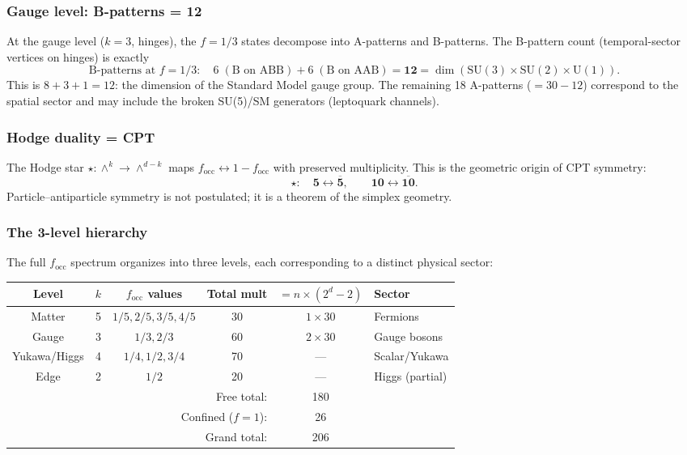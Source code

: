 \subsubsection{Gauge level: B-patterns = 12}

At the gauge level ($k = 3$, hinges), the $f = 1/3$ states decompose into A-patterns and B-patterns.  The B-pattern count (temporal-sector vertices on hinges) is exactly
\begin{equation}
\text{B-patterns at } f = 1/3: \quad 6\;(\text{B on ABB}) + 6\;(\text{B on AAB}) = \mathbf{12} = \dim(\text{SU}(3) \times \text{SU}(2) \times \text{U}(1)).
\end{equation}
This is $8 + 3 + 1 = 12$: the dimension of the Standard Model gauge group.  The remaining 18 A-patterns ($= 30 - 12$) correspond to the spatial sector and may include the broken SU(5)/SM generators (leptoquark channels).

\subsubsection{Hodge duality = CPT}

The Hodge star $\star: \wedge^k \to \wedge^{d-k}$ maps $f_\mathrm{occ} \leftrightarrow 1 - f_\mathrm{occ}$ with preserved multiplicity.  This is the geometric origin of CPT symmetry:
\begin{equation}
\star: \quad \mathbf{5} \leftrightarrow \overline{\mathbf{5}}, \qquad \mathbf{10} \leftrightarrow \overline{\mathbf{10}}.
\end{equation}
Particle--antiparticle symmetry is not postulated; it is a theorem of the simplex geometry.

\subsubsection{The 3-level hierarchy}

The full $f_\mathrm{occ}$ spectrum organizes into three levels, each corresponding to a distinct physical sector:
\begin{center}
\begin{tabular}{cccccl}
\hline
Level & $k$ & $f_\mathrm{occ}$ values & Total mult & $= n \times (2^d - 2)$ & Sector \\
\hline
Matter & 5 & $1/5, 2/5, 3/5, 4/5$ & 30 & $1 \times 30$ & Fermions \\
Gauge  & 3 & $1/3, 2/3$           & 60 & $2 \times 30$ & Gauge bosons \\
Yukawa/Higgs & 4 & $1/4, 1/2, 3/4$ & 70 & --- & Scalar/Yukawa \\
Edge   & 2 & $1/2$                & 20 & --- & Higgs (partial) \\
\hline
\multicolumn{4}{r}{Free total:} & 180 & \\
\multicolumn{4}{r}{Confined ($f=1$):} & 26 & \\
\multicolumn{4}{r}{Grand total:} & 206 & \\
\hline
\end{tabular}
\end{center}

